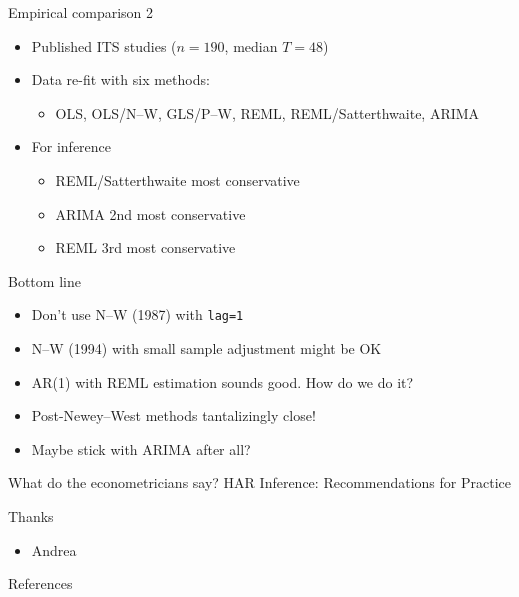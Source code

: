 \documentclass[aspectratio=169,12pt]{beamer} %
\begin{document}
\begin{frame}{Empirical comparison 2}
	\begin{itemize}
		\item Published ITS studies (\( n=190 \), median \(T=48\))
		\citep{turner_comparison_2020}
		\item Data re-fit with six methods:
		\begin{itemize}
			\item OLS, OLS/N--W, GLS/P--W, REML, REML/Satterthwaite, ARIMA
		\end{itemize}
		\item For inference
		\begin{itemize}
			\item REML/Satterthwaite most conservative
			\item ARIMA 2nd most conservative
			\item REML 3rd most conservative
		\end{itemize}
	\end{itemize}
\end{frame}

\begin{frame}{Bottom line}
    \begin{itemize}
        \item Don't use N--W (1987) with \texttt{lag=1}
        \item N--W (1994) with small sample adjustment might be OK
		\item AR(1) with REML estimation sounds good. How do we do it?
        \item Post-Newey--West methods tantalizingly close!
		\item Maybe stick with ARIMA after all?
    \end{itemize}
\end{frame}

\begin{frame}{What do the econometricians say?}
HAR Inference: Recommendations for Practice

\cite{lazarus_har_2018}
\end{frame}

\begin{frame}{Thanks}
    \begin{itemize}
        \item Andrea
    \end{itemize}
\end{frame}

\begin{frame}{References}
%        
%        
        \tiny
        
\end{frame}
\end{document}
